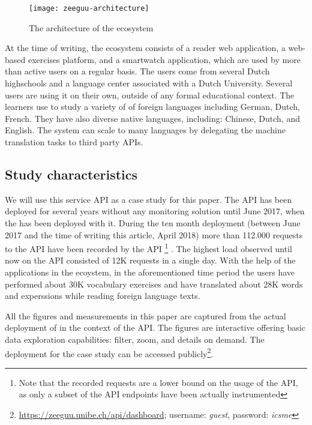     \begin{figure}[h!]
      \centering
      \texttt{[image: zeeguu-architecture]}
      \caption{The architecture of the \zee ecosystem}
      \label{fig:zeeguuarch}
    \end{figure}  


  At the time of writing, the ecosystem consists of a reader web application, a web-based exercises platform, and a smartwatch application, which are used by more than \activeUserCount active users on a regular basis. The users come from several Dutch highschools and a language center associated with a Dutch University. Several users are using it on their own, outside of any formal educational context. The learners use \zee to study a variety of of foreign languages including German, Dutch, French. They have also diverse native languages, including: Chinese, Dutch, and English. The system can scale to many languages by delegating the machine translation tasks to third party APIs. 



\subsection*{Study characteristics}

  We will use this \zee service API as a case study for this paper. 
  The API has been deployed for several years without any monitoring
  solution until June 2017, when the \tool has been deployed with it. 
  During the ten month deployment (between June 2017 and the time of writing this
  article, April 2018) more than 112.000 requests
  to the API have been recorded by the API \footnote{Note that the 
  recorded requests are a lower bound on the usage of the API, 
  as only a subset of the API endpoints have been actually instrumented} . The highest load observed 
  until now on the API consisted of 12K requests in a single day. 
  With the help of the applications in the ecoystem, in the aforementioned
  time period the users have 
  performed about 30K vocabulary exercises and have translated 
  about 28K words and experssions while reading foreign language 
  texts. 

  All the figures and measurements in this paper are captured from the actual deployment of \tool in the context of the \zee API. The figures are interactive offering basic data exploration capabilities: filter, zoom, and details on demand\cite{Shne99a}. The \tool deployment for the case study can be accessed publicly\footnote{\url{https://zeeguu.unibe.ch/api/dashboard}; username: {\em guest}, password: {\em icsme}}. 



